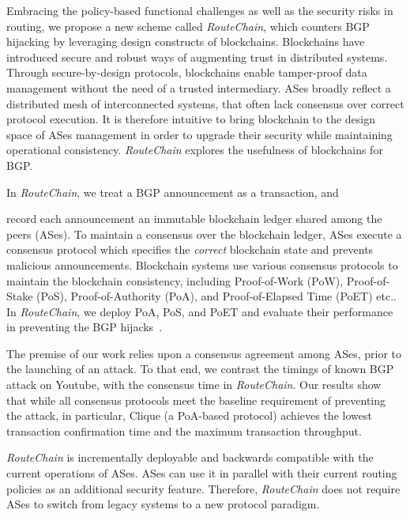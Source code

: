 \documentclass[5p]{elsarticle}
\newcommand{\rc}{{{\em RouteChain}}\xspace}
\newcommand{\etc}{{etc.}\xspace}
\begin{document}

Embracing the policy-based functional challenges as well as the security risks in routing, we propose a new scheme called \rc, which counters BGP hijacking by leveraging design constructs of blockchains. Blockchains have introduced secure and robust ways of augmenting trust in distributed systems. Through secure-by-design protocols, blockchains enable tamper-proof data management without the need of a trusted intermediary. ASes broadly reflect a distributed mesh of interconnected systems, that often lack consensus over correct protocol execution. It is therefore intuitive to bring blockchain to the design space of ASes management in order to upgrade their security while maintaining operational consistency. \rc explores the usefulness of blockchains for BGP. 

In \rc, we treat a BGP announcement as a transaction, and {\color{blue} record each announcement an immutable blockchain ledger shared among the peers (ASes). To maintain a consensus over the blockchain ledger, ASes execute a consensus protocol which specifies the {\em correct} blockchain state and prevents malicious announcements. Blockchain systems use various consensus protocols to maintain the blockchain consistency, including Proof-of-Work (PoW), Proof-of-Stake (PoS), Proof-of-Authority (PoA), and Proof-of-Elapsed Time (PoET) \etc. In \rc, we deploy PoA, PoS, and PoET and evaluate their performance in preventing the BGP hijacks~\cite{BanoSAAMMD17,Angelis18,SaadSNKSNM20}.    

The premise of our work relies upon a consensus agreement among ASes, prior to the launching of an attack. To that end, we contrast the timings of known BGP attack on Youtube, with the consensus time in \rc. Our results show that while all consensus protocols meet the baseline requirement of preventing the attack, in particular, Clique (a PoA-based protocol) achieves the lowest transaction confirmation time and the maximum transaction throughput.} \rc is incrementally deployable and backwards compatible with the current operations of ASes. ASes can use it in parallel with their current routing policies as an additional security feature. Therefore, \rc does not require ASes to switch from legacy systems to a new protocol paradigm. 
\end{document}
